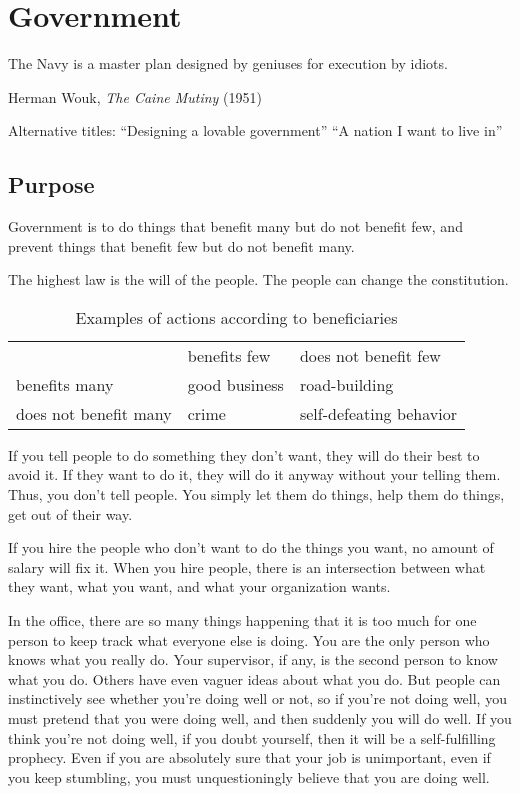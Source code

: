 \chapter{Government}

\epigraph{The Navy is a master plan designed by geniuses for execution by idiots.}{Herman Wouk, \emph{The Caine Mutiny} (1951)}

Alternative titles:
``Designing a lovable government''
``A nation I want to live in''

\section{Purpose}

Government is to do things that benefit many but do not benefit few,
and prevent things that benefit few but do not benefit many.

The highest law is the will of the people.
The people can change the constitution.

\begin{table}[h]
    \caption{Examples of actions according to beneficiaries}
    \begin{tabular}{lll}
        & benefits few & does not benefit few
        \\
        benefits many & good business & road-building
        \\
        does not benefit many & crime & self-defeating behavior
    \end{tabular}
\end{table}

If you tell people to do something they don't want,
they will do their best to avoid it.
If they want to do it,
they will do it anyway without your telling them.
Thus, you don't tell people.
You simply let them do things,
help them do things,
get out of their way.

If you hire the people who don't want to do the things you want,
no amount of salary will fix it.
When you hire people, there is an intersection between what they want,
what you want, and what your organization wants.

In the office, there are so many things happening that it is too much
for one person to keep track what everyone else is doing.
You are the only person who knows what you really do.
Your supervisor, if any, is the second person to know what you do.
Others have even vaguer ideas about what you do.
But people can instinctively see whether you're doing well or not,
so if you're not doing well,
you must pretend that you were doing well,
and then suddenly you will do well.
If you think you're not doing well, if you doubt yourself,
then it will be a self-fulfilling prophecy.
Even if you are absolutely sure that your job is unimportant,
even if you keep stumbling,
you must unquestioningly believe that you are doing well.

